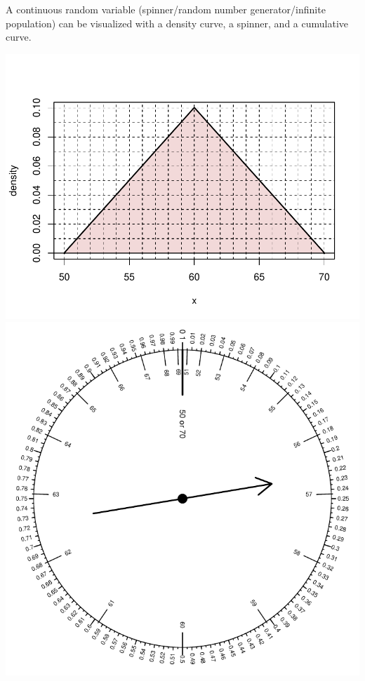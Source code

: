 
\begin{question}
A continuous random variable (spinner/random number generator/infinite
population) can be visualized with a density curve, a spinner, and a
cumulative curve.

\includegraphics{unnamed-chunk-1-1.pdf}\\

\includegraphics{unnamed-chunk-2-1.pdf}\\


\end{question}
